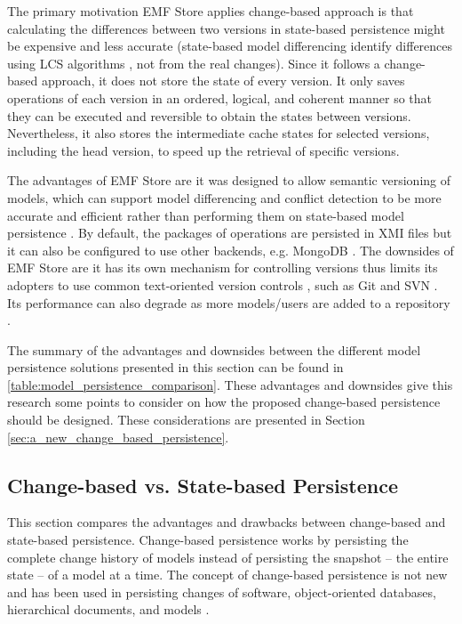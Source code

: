 The primary motivation EMF Store applies change-based approach is that calculating the differences between two versions in state-based persistence might be expensive and less accurate (state-based model differencing identify differences using LCS algorithms \cite{emfcompare2018developer,DBLP:journals/algorithmica/Meyers86}, not from the real changes). Since it follows a change-based approach, it does not store the state of every version. It only saves operations of each version in an ordered, logical, and coherent manner so that they can be executed and reversible to obtain the states between versions. Nevertheless, it also stores the intermediate cache states for selected versions, including the head version, to speed up the retrieval of specific versions.

The advantages of EMF Store are it was designed to allow semantic versioning of models, which can support model differencing and conflict detection to be more accurate and efficient rather than performing them on state-based model persistence \cite{emfstore2019versioning}. By default, the packages of operations are persisted in XMI files but it can also be configured to use other backends, e.g. MongoDB \cite{emfstore2019mongodb}. The downsides of EMF Store are it has its own mechanism for controlling versions thus limits its adopters to use common text-oriented version controls \cite{emfstore2019getting}, such as Git and SVN . Its performance can also degrade as more models/users are added to a repository \cite{KolovosRMPGCLRV13}.

The summary of the advantages and downsides between the different model persistence solutions presented in this section can be found in \ref{table:model_persistence_comparison}. These advantages and downsides give this research some points to consider on how the proposed change-based persistence should be designed. These considerations are presented in Section \ref{sec:a_new_change_based_persistence}.

\subsection{Change-based vs. State-based Persistence}
\label{sec:change_based_vs_state_based_persistence}
This section compares the advantages and drawbacks between change-based and state-based persistence. Change-based persistence works by persisting the complete change history of models instead of persisting the snapshot -- the entire state -- of a model at a time. The concept of change-based persistence is not new and has been used in persisting changes of software, object-oriented databases, hierarchical documents, and models 
\cite{DBLP:journals/entcs/RobbesL07,DBLP:conf/sde/LippeO92,DBLP:conf/caise/IgnatN05,koegel2010emfstore}. 

